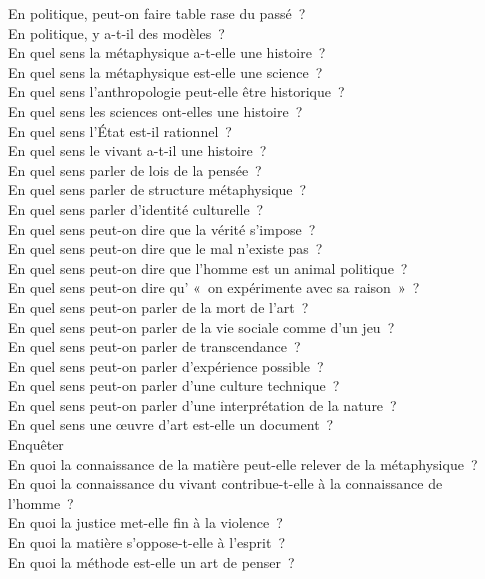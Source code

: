\documentclass[a4paper,12pt]{article}
\begin{document}
En politique, peut-on faire table rase du passé ? \\
En politique, y a-t-il des modèles ? \\
En quel sens la métaphysique a-t-elle une histoire ? \\
En quel sens la métaphysique est-elle une science ? \\
En quel sens l'anthropologie peut-elle être historique ? \\
En quel sens les sciences ont-elles une histoire ? \\
En quel sens l'État est-il rationnel ? \\
En quel sens le vivant a-t-il une histoire ? \\
En quel sens parler de lois de la pensée ? \\
En quel sens parler de structure métaphysique ? \\
En quel sens parler d'identité culturelle ? \\
En quel sens peut-on dire que la vérité s'impose ? \\
En quel sens peut-on dire que le mal n'existe pas ? \\
En quel sens peut-on dire que l'homme est un animal politique ? \\
En quel sens peut-on dire qu' « on expérimente avec sa raison » ? \\
En quel sens peut-on parler de la mort de l'art ? \\
En quel sens peut-on parler de la vie sociale comme d'un jeu ? \\
En quel sens peut-on parler de transcendance ? \\
En quel sens peut-on parler d'expérience possible ? \\
En quel sens peut-on parler d'une culture technique ? \\
En quel sens peut-on parler d'une interprétation de la nature ? \\
En quel sens une œuvre d'art est-elle un document ? \\
Enquêter \\
En quoi la connaissance de la matière peut-elle relever de la métaphysique ? \\
En quoi la connaissance du vivant contribue-t-elle à la connaissance de l'homme ? \\
En quoi la justice met-elle fin à la violence ? \\
En quoi la matière s'oppose-t-elle à l'esprit ? \\
En quoi la méthode est-elle un art de penser ? \\
\end{document}
